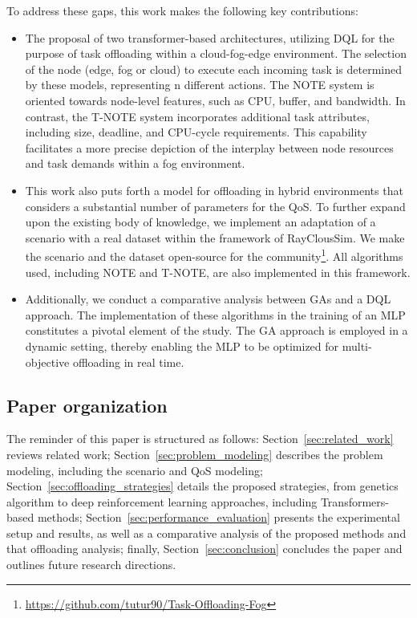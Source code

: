 \documentclass{svproc}
\begin{document}
To address these gaps, this work makes the following key contributions:
\begin{itemize} 
    \item The proposal of two transformer-based architectures, utilizing DQL for the purpose of task offloading within a cloud-fog-edge environment. The selection of the node (edge, fog or cloud) to execute each incoming task is determined by these models, representing n different actions. The NOTE system is oriented towards node-level features, such as CPU, buffer, and bandwidth. In contrast, the T-NOTE system incorporates additional task attributes, including size, deadline, and CPU-cycle requirements. This capability facilitates a more precise depiction of the interplay between node resources and task demands within a fog environment.

    \item This work also puts forth a model for offloading in hybrid environments that considers a substantial number of parameters for the QoS. To further expand upon the existing body of knowledge, we implement an adaptation of a scenario with a real dataset within the framework of RayClousSim. We make the scenario and the dataset open-source for the community\footnote{\url{https://github.com/tutur90/Task-Offloading-Fog}}. All algorithms used, including NOTE and T-NOTE, are also implemented in this framework.

    \item Additionally, we conduct a comparative analysis between GAs and a DQL approach. The implementation of these algorithms in the training of an MLP constitutes a pivotal element of the study. The GA approach is employed in a dynamic setting, thereby enabling the MLP to be optimized for multi-objective offloading in real time.
\end{itemize}


\subsection{Paper organization}

The reminder of this paper is structured as follows: Section~\ref{sec:related_work} reviews related work; Section~\ref{sec:problem_modeling} describes the problem modeling, including the scenario and QoS modeling; Section~\ref{sec:offloading_strategies} details the proposed strategies, from genetics algorithm to deep reinforcement learning approaches, including Transformers-based methods; Section~\ref{sec:performance_evaluation} presents the experimental setup and results, as well as a comparative analysis of the proposed methods and that offloading analysis; finally, Section~\ref{sec:conclusion} concludes the paper and outlines future research directions.
\end{document}
